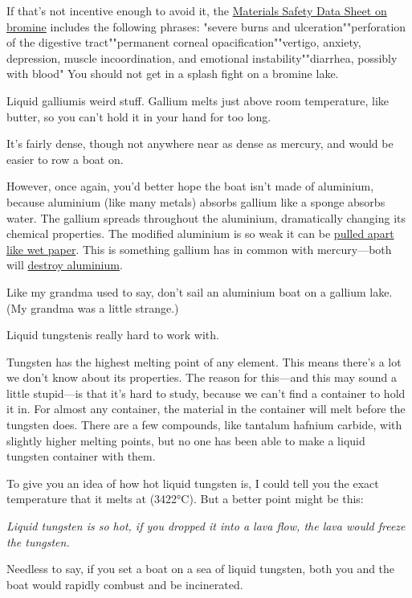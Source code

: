 {{If that's not incentive enough to avoid it, the \href{http://avogadro.chem.iastate.edu/MSDS/Br2.htm}{Materials Safety Data Sheet on bromine} includes the following phrases:}
"severe burns and ulceration""perforation of the digestive tract""permanent corneal opacification""vertigo, anxiety, depression, muscle incoordination, and emotional instability""diarrhea, possibly with blood"
{You should not get in a splash fight on a bromine lake.}

{Liquid galliumis weird stuff. Gallium melts just above room temperature, like butter, so you can't hold it in your hand for too long.}

{It's fairly dense, though not anywhere near as dense as mercury, and would be easier to row a boat on.}

{However, once again, you'd better hope the boat isn't made of aluminium, because aluminium (like many metals) absorbs gallium like a sponge absorbs water. The gallium spreads throughout the aluminium, dramatically changing its chemical properties. The modified aluminium is so weak it can be \href{http://www.youtube.com/watch?v=FaMWxLCGY0U}{pulled apart like wet paper}. This is something gallium has in common with mercury—both will \href{http://www.youtube.com/watch?v=Z7Ilxsu-JlY} {destroy aluminium}.}

{Like my grandma used to say, don't sail an aluminium boat on a gallium lake. (My grandma was a little strange.)}

{Liquid tungstenis really hard to work with.}

{Tungsten has the highest melting point of any element. This means there's a lot we don't know about its properties. The reason for this—and this may sound a little stupid—is that it's hard to study, because we can't find a container to hold it in. For almost any container, the material in the container will melt before the tungsten does. There are a few compounds, like tantalum hafnium carbide, with slightly higher melting points, but no one has been able to make a liquid tungsten container with them.}

{To give you an idea of how hot liquid tungsten is, I could tell you the exact temperature that it melts at (3422°C). But a better point might be this:}

{ \emph{Liquid tungsten is so hot, if you dropped it into a lava flow, the lava would freeze the tungsten.} }

{Needless to say, if you set a boat on a sea of liquid tungsten, both you and the boat would rapidly combust and be incinerated.}

}

